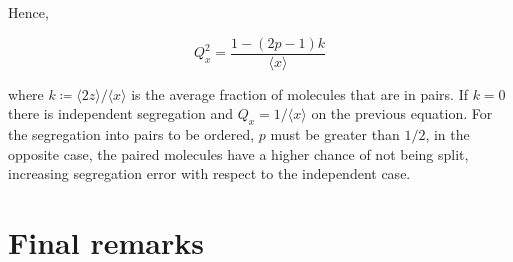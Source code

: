 Hence,

\begin{equation}
  \boxed{Q_x^2 = \frac{1 - (2p-1)k}{\langle x\rangle}}
\end{equation}

where $k\coloneqq\langle 2z\rangle/\langle x\rangle$ is the average fraction of molecules that are in pairs. If $k=0$ there is independent segregation and $Q_x = 1/\langle x\rangle$ on the previous equation. For the segregation into pairs to be ordered, $p$ must be greater than $1/2$, in the opposite case, the paired molecules have a higher chance of not being split, increasing segregation error with respect to the independent case.

\section{Final remarks}
